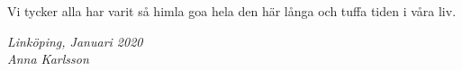 \begin{acknowledgments}
  Vi tycker alla har varit så himla goa hela den här långa och tuffa tiden i våra liv.

  \addvspace{1em}
  \begin{flushright}
    \textit{%
      Linköping, Januari 2020\\
      Anna Karlsson%
    }
  \end{flushright}
\end{acknowledgments}
